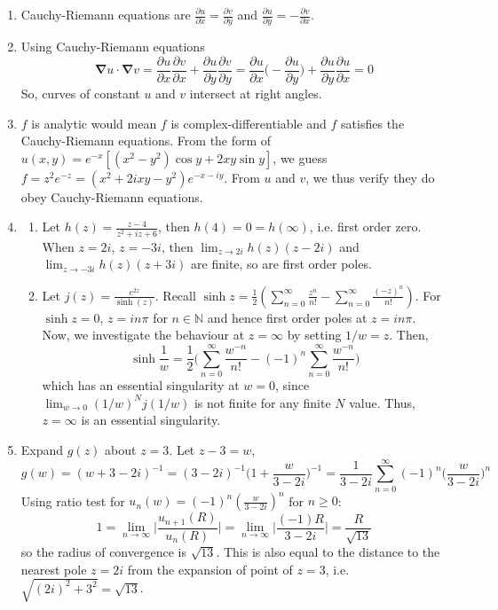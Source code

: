 \documentclass[a4paper]{article}
\begin{document}
\begin{ans}\leavevmode
\begin{enumerate}[label=(\alph*)]
\item Cauchy-Riemann equations are $\frac{\partial u}{\partial x}=\frac{\partial v}{\partial y}$ and $\frac{\partial u}{\partial y}=-\frac{\partial v}{\partial x}$.
\item Using Cauchy-Riemann equations
$$\boldsymbol{\nabla}u\cdot\boldsymbol{\nabla}v=\frac{\partial u}{\partial x}\frac{\partial v}{\partial x}+\frac{\partial u}{\partial y}\frac{\partial v}{\partial y}=\frac{\partial u}{\partial x}\bigg(-\frac{\partial u}{\partial y}\bigg)+\frac{\partial u}{\partial y}\frac{\partial u}{\partial x}=0$$
So, curves of constant $u$ and $v$ intersect at right angles.
\item $f$ is analytic would mean $f$ is complex-differentiable and $f$ satisfies the Cauchy-Riemann equations. From the form of $u(x,y)=e^{-x}[(x^2-y^2)\cos y+2xy\sin y]$, we guess $f=z^2e^{-z}=(x^2+2ixy-y^2)e^{-x-iy}$. From $u$ and $v$, we thus verify they do obey Cauchy-Riemann equations.
\item 
\begin{enumerate}[label=(\roman*)]
\item Let $h(z)=\frac{z-4}{z^2+iz+6}$, then $h(4)=0=h(\infty)$, i.e. first order zero. When $z=2i$, $z=-3i$, then $\lim_{z\rightarrow 2i}h(z)(z-2i)$ and $\lim_{z\rightarrow -3i}h(z)(z+3i)$ are finite, so are first order poles.
\item Let $j(z)=\frac{e^{2z}}{\sinh(z)}$. Recall $\sinh z=\frac{1}{2}(\sum_{n=0}^\infty\frac{z^n}{n!}-\sum_{n=0}^\infty\frac{(-z)^n}{n!})$. For $\sinh z=0$, $z=in\pi$ for $n\in\mathbb{N}$ and hence first order poles at $z=in\pi$. Now, we investigate the behaviour at $z=\infty$ by setting $1/w=z$. Then,
$$\sinh\frac{1}{w}=\frac{1}{2}\bigg(\sum_{n=0}^\infty\frac{w^{-n}}{n!}-(-1)^n\sum_{n=0}^\infty\frac{w^{-n}}{n!}\bigg)$$
which has an essential singularity at $w=0$, since $\lim_{w\rightarrow 0}(1/w)^Nj(1/w)$ is not finite for any finite $N$ value. Thus, $z=\infty$ is an essential singularity.
\end{enumerate}
\item Expand $g(z)$ about $z=3$. Let $z-3=w$,
$$g(w)=(w+3-2i)^{-1}=(3-2i)^{-1}\bigg(1+\frac{w}{3-2i}\bigg)^{-1}=\frac{1}{3-2i}\sum_{n=0}^\infty (-1)^n\bigg(\frac{w}{3-2i}\bigg)^n$$
Using ratio test for $u_n(w)=(-1)^n(\frac{w}{3-2i})^n$ for $n\geq 0$:
$$1=\lim_{n\rightarrow\infty}\bigg|\frac{u_{n+1}(R)}{u_n(R)}\bigg|=\lim_{n\rightarrow\infty}\bigg|\frac{(-1)R}{3-2i}\bigg|=\frac{R}{\sqrt{13}}$$
so the radius of convergence is $\sqrt{13}$. This is also equal to the distance to the nearest pole $z=2i$ from the expansion of point of $z=3$, i.e. $\sqrt{(2i)^2+3^2}=\sqrt{13}$. 
\end{enumerate}
\end{ans}
\end{document}
